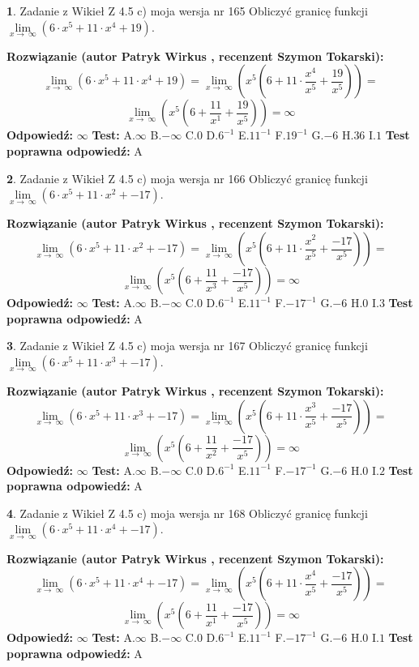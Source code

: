 \documentclass[12pt, a4paper]{article}
\theoremstyle{definition} %
\newtheorem{zad}{}
\newcommand{\zadStart}[1]{\begin{zad}#1\newline}
\newcommand{\zadStop}{\end{zad}}
\newcommand{\rozwStart}[2]{\noindent \textbf{Rozwiązanie (autor #1 , recenzent #2): }\newline}
\newcommand{\rozwStop}{\newline}
\newcommand{\odpStart}{\noindent \textbf{Odpowiedź:}\newline}
\newcommand{\odpStop}{\newline}
\newcommand{\testStart}{\noindent \textbf{Test:}\newline}
\newcommand{\testStop}{\newline}
\newcommand{\kluczStart}{\noindent \textbf{Test poprawna odpowiedź:}\newline}
\newcommand{\kluczStop}{\newline}
\begin{document}
\zadStart{Zadanie z Wikieł Z 4.5 c) moja wersja nr 165}
Obliczyć granicę funkcji  $\lim\limits_{x\to\ \infty}(6 \cdot x^{5}+11 \cdot x^{4}+19)$.
\zadStop
\rozwStart{Patryk Wirkus}{Szymon Tokarski}
$$\lim\limits_{x\to\ \infty}(6 \cdot x^{5}+11 \cdot x^{4}+19) = \lim\limits_{x\to\ \infty}(x^{5}(6 +11 \cdot \frac{x^{4}}{x^{5}}+\frac{19}{x^{5}})) =$$ $$\lim\limits_{x\to\ \infty}(x^{5}(6 +\frac{11}{x^{1}}+\frac{19}{x^{5}})) =\infty$$
\rozwStop
\odpStart
$\infty$
\odpStop
\testStart
A.$\infty$ B.$-\infty$ C.$0$ D.$6^{-1}$ E.$11^{-1}$
F.$19^{-1}$ G.$-6$
H.$36$
I.$1$
\testStop
\kluczStart
A
\kluczStop



\zadStart{Zadanie z Wikieł Z 4.5 c) moja wersja nr 166}
Obliczyć granicę funkcji  $\lim\limits_{x\to\ \infty}(6 \cdot x^{5}+11 \cdot x^{2}+-17)$.
\zadStop
\rozwStart{Patryk Wirkus}{Szymon Tokarski}
$$\lim\limits_{x\to\ \infty}(6 \cdot x^{5}+11 \cdot x^{2}+-17) = \lim\limits_{x\to\ \infty}(x^{5}(6 +11 \cdot \frac{x^{2}}{x^{5}}+\frac{-17}{x^{5}})) =$$ $$\lim\limits_{x\to\ \infty}(x^{5}(6 +\frac{11}{x^{3}}+\frac{-17}{x^{5}})) =\infty$$
\rozwStop
\odpStart
$\infty$
\odpStop
\testStart
A.$\infty$ B.$-\infty$ C.$0$ D.$6^{-1}$ E.$11^{-1}$
F.$-17^{-1}$ G.$-6$
H.$0$
I.$3$
\testStop
\kluczStart
A
\kluczStop



\zadStart{Zadanie z Wikieł Z 4.5 c) moja wersja nr 167}
Obliczyć granicę funkcji  $\lim\limits_{x\to\ \infty}(6 \cdot x^{5}+11 \cdot x^{3}+-17)$.
\zadStop
\rozwStart{Patryk Wirkus}{Szymon Tokarski}
$$\lim\limits_{x\to\ \infty}(6 \cdot x^{5}+11 \cdot x^{3}+-17) = \lim\limits_{x\to\ \infty}(x^{5}(6 +11 \cdot \frac{x^{3}}{x^{5}}+\frac{-17}{x^{5}})) =$$ $$\lim\limits_{x\to\ \infty}(x^{5}(6 +\frac{11}{x^{2}}+\frac{-17}{x^{5}})) =\infty$$
\rozwStop
\odpStart
$\infty$
\odpStop
\testStart
A.$\infty$ B.$-\infty$ C.$0$ D.$6^{-1}$ E.$11^{-1}$
F.$-17^{-1}$ G.$-6$
H.$0$
I.$2$
\testStop
\kluczStart
A
\kluczStop



\zadStart{Zadanie z Wikieł Z 4.5 c) moja wersja nr 168}
Obliczyć granicę funkcji  $\lim\limits_{x\to\ \infty}(6 \cdot x^{5}+11 \cdot x^{4}+-17)$.
\zadStop
\rozwStart{Patryk Wirkus}{Szymon Tokarski}
$$\lim\limits_{x\to\ \infty}(6 \cdot x^{5}+11 \cdot x^{4}+-17) = \lim\limits_{x\to\ \infty}(x^{5}(6 +11 \cdot \frac{x^{4}}{x^{5}}+\frac{-17}{x^{5}})) =$$ $$\lim\limits_{x\to\ \infty}(x^{5}(6 +\frac{11}{x^{1}}+\frac{-17}{x^{5}})) =\infty$$
\rozwStop
\odpStart
$\infty$
\odpStop
\testStart
A.$\infty$ B.$-\infty$ C.$0$ D.$6^{-1}$ E.$11^{-1}$
F.$-17^{-1}$ G.$-6$
H.$0$
I.$1$
\testStop
\kluczStart
A
\kluczStop
\end{document}
